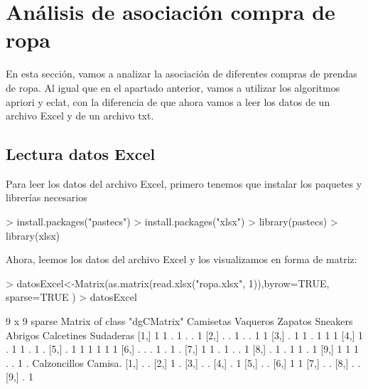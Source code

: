 \documentclass [a4paper] {article}
\begin{document}
\section{Análisis de asociación compra de ropa }
En esta sección, vamos a analizar la asociación de diferentes compras de prendas de ropa.
Al igual que en el apartado anterior, vamos a utilizar los algoritmos apriori y eclat,
con la diferencia de que ahora vamos a leer los datos de un archivo Excel y de un archivo
txt.

\subsection{Lectura datos Excel}
Para leer los datos del archivo Excel, primero tenemos que instalar los paquetes
y librerías necesarios

\begin{Schunk}
\begin{Sinput}
> install.packages("pastecs")
> install.packages("xlsx")
> library(pastecs)
> library(xlsx)
\end{Sinput}
\end{Schunk}

Ahora, leemos los datos del archivo Excel y los visualizamos en forma de matriz:

\begin{Schunk}
\begin{Sinput}
> datosExcel<-Matrix(as.matrix(read.xlsx("ropa.xlsx", 1)),byrow=TRUE, sparse=TRUE )
> datosExcel
\end{Sinput}
\begin{Soutput}
9 x 9 sparse Matrix of class "dgCMatrix"
      Camisetas Vaqueros Zapatos Sneakers Abrigos Calcetines Sudaderas
 [1,]         1        1       .        1       .          .         1
 [2,]         .        .       1        .       .          1         1
 [3,]         .        1       1        .       1          1         1
 [4,]         1        .       1        1       .          1         .
 [5,]         .        1       1        1       1          1         1
 [6,]         .        .       .        1       .          1         .
 [7,]         1        1       .        1       .          .         1
 [8,]         .        1       .        1       1          .         1
 [9,]         1        1       1        .       .          1         .
      Calzoncillos Camisa.
 [1,]            .       .
 [2,]            1       .
 [3,]            .       .
 [4,]            .       1
 [5,]            .       .
 [6,]            1       1
 [7,]            .       .
 [8,]            .       .
 [9,]            .       1
\end{Soutput}
\end{Schunk}
\end{document}
